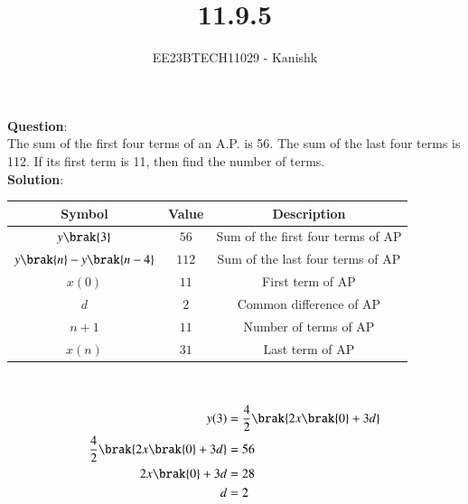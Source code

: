 \documentclass[journal,12pt,twocolumn]{IEEEtran}
\theoremstyle{remark}
\begin{document}

\vspace{3cm}

\title{11.9.5}
\author{EE23BTECH11029 - Kanishk}
\maketitle

\bigskip



\renewcommand{\thefigure}{\theenumi}
\renewcommand{\thetable}{\theenumi}
\textbf{Question}:\\ 
The sum of the first four terms of an A.P. is 56. The sum of the last four terms is
112. If its first term is 11, then find the number of terms.\\

\textbf{Solution}:\\ 

\footnotesize
\centering
\begin{tabular}{|c|c|c|}
\hline
Symbol & Value & Description\\
\hline
$y\brak{3}$ & $56$ & Sum of the first four terms of AP\\
\hline
$y\brak{n}-y\brak{n-4}$ & $112$& Sum of the last four terms of AP\\
\hline
$x(0)$ & $11$ & First term of AP \\
\hline
$d$ &$ 2$ & Common difference of AP\\
\hline
$n+1$ & $11$ & Number of terms of AP\\
\hline
$x(n)$ & $31$ & Last term of AP\\
\hline

\end{tabular}
\\
\small


\begin{align}
y(3)&=\frac{4}{2}\brak{2x\brak{0}+3d}\\
\frac{4}{2}\brak{2x\brak{0}+3d}&=56\\
2x\brak{0}+3d&=28\\
d&=2
\end{align}
\end{document}
